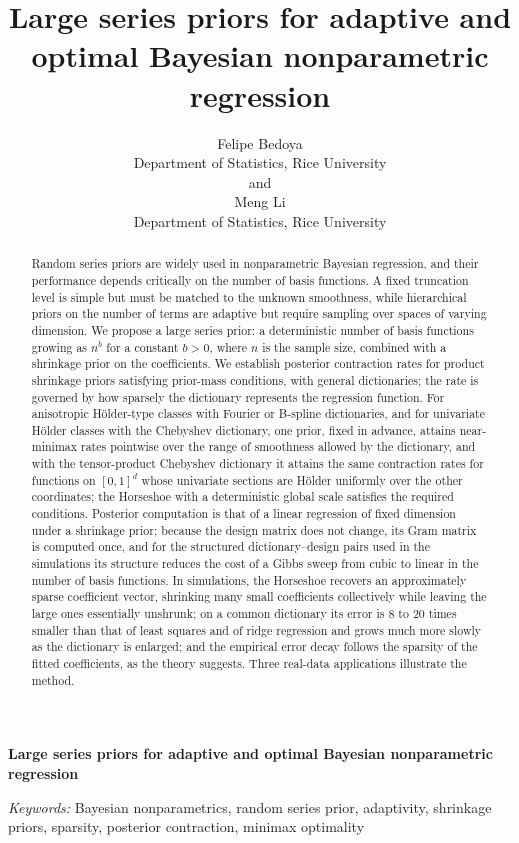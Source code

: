 \anon
{
  \title{\bfseries Large series priors for adaptive and optimal Bayesian nonparametric regression}
  \author{Felipe Bedoya \\
    Department of Statistics, Rice University\\
    and \\
    Meng Li \\
    Department of Statistics, Rice University}
  \date{}\maketitle
} \fi

\anon
{
  \bigskip
  \bigskip
  \bigskip
  \begin{center}
    {\LARGE\bfseries Large series priors for adaptive and optimal Bayesian nonparametric regression}
\end{center}
  \medskip
} \fi

\bigskip
\begin{abstract}
Random series priors are widely used in nonparametric Bayesian regression, and their performance depends critically on the number of basis functions. A fixed truncation level is simple but must be matched to the unknown smoothness, while hierarchical priors on the number of terms are adaptive but require sampling over spaces of varying dimension. We propose a large series prior: a deterministic number of basis functions growing as $n^b$ for a constant $b>0$, where $n$ is the sample size, combined with a shrinkage prior on the coefficients. We establish posterior contraction rates for product shrinkage priors satisfying prior-mass conditions, with general dictionaries; the rate is governed by how sparsely the dictionary represents the regression function. For anisotropic H\"older-type classes with Fourier or B-spline dictionaries, and for univariate H\"older classes with the Chebyshev dictionary, one prior, fixed in advance, attains near-minimax rates pointwise over the range of smoothness allowed by the dictionary, and with the tensor-product Chebyshev dictionary it attains the same contraction rates for functions on $[0,1]^d$ whose univariate sections are H\"older uniformly over the other coordinates; the Horseshoe with a deterministic global scale satisfies the required conditions. Posterior computation is that of a linear regression of fixed dimension under a shrinkage prior; because the design matrix does not change, its Gram matrix is computed once, and for the structured dictionary--design pairs used in the simulations its structure reduces the cost of a Gibbs sweep from cubic to linear in the number of basis functions. In simulations, the Horseshoe recovers an approximately sparse coefficient vector, shrinking many small coefficients collectively while leaving the large ones essentially unshrunk; on a common dictionary its error is $8$ to $20$ times smaller than that of least squares and of ridge regression and grows much more slowly as the dictionary is enlarged; and the empirical error decay follows the sparsity of the fitted coefficients, as the theory suggests. Three real-data applications illustrate the method.
\end{abstract}

\noindent%
{\it Keywords:} Bayesian nonparametrics, random series prior, adaptivity, shrinkage priors, sparsity, posterior contraction, minimax optimality 
\vfill
